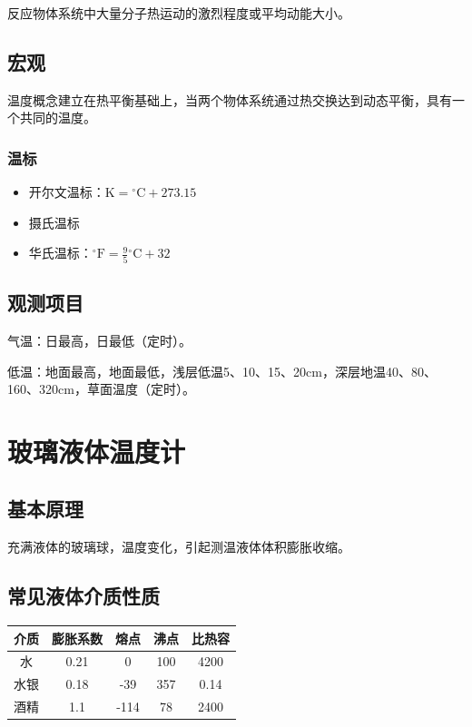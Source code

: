 \documentclass[UTF8,11pt]{ctexbook}
\begin{document}
反应物体系统中大量分子热运动的激烈程度或平均动能大小。

\subsection{宏观}

温度概念建立在热平衡基础上，当两个物体系统通过热交换达到动态平衡，具有一个共同的温度。

\subsubsection{温标}
\begin{itemize}
    \item 开尔文温标：\(\mathrm{K}={^\circ\mathrm{C}}+273.15\)
    \item 摄氏温标
    \item 华氏温标：\(^\circ\mathrm{F}=\frac{9}{5}{^\circ\mathrm{C}}+32\)
\end{itemize}

\subsection{观测项目}

气温：日最高，日最低（定时）。

低温：地面最高，地面最低，浅层低温5、10、15、20cm，深层地温40、80、160、320cm，草面温度（定时）。

\section{玻璃液体温度计}

\subsection{基本原理}

充满液体的玻璃球，温度变化，引起测温液体体积膨胀收缩。

\subsection{常见液体介质性质}
\begin{table}[htbp]
    \centering
    \begin{tabular}{|*{5}{c|}}
        \hline
        介质 & 膨胀系数 & 熔点 & 沸点 & 比热容\\
        \hline
        水 & 0.21 & 0 & 100 & 4200\\
        \hline
        水银 & 0.18 & -39 & 357 & 0.14\\
        \hline
        酒精 & 1.1 & -114 & 78 & 2400\\
        \hline
    \end{tabular}
\end{table}
\end{document}
